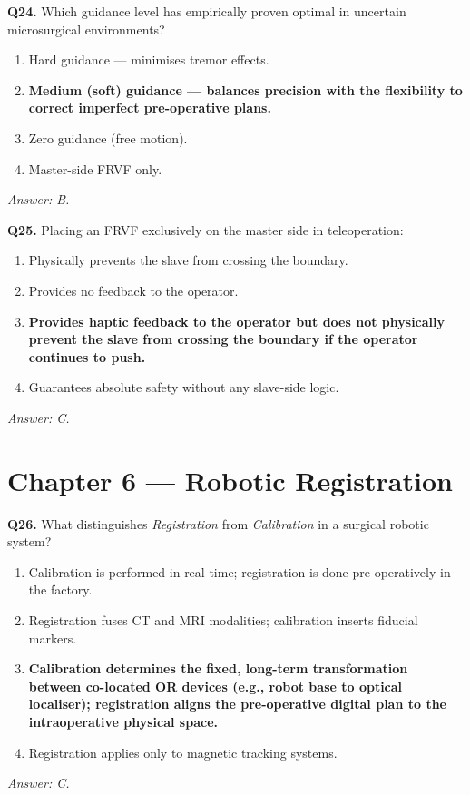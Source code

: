 \documentclass[11pt,a4paper,twoside]{report}
\begin{document}
\bigskip
\textbf{Q24.} Which guidance level has empirically proven optimal in uncertain microsurgical environments?
\begin{enumerate}[label=\Alph*.]
    \item Hard guidance — minimises tremor effects.
    \item \textbf{Medium (soft) guidance — balances precision with the flexibility to correct imperfect pre-operative plans.}
    \item Zero guidance (free motion).
    \item Master-side FRVF only.
\end{enumerate}
\textit{Answer: B.}

\bigskip
\textbf{Q25.} Placing an FRVF exclusively on the master side in teleoperation:
\begin{enumerate}[label=\Alph*.]
    \item Physically prevents the slave from crossing the boundary.
    \item Provides no feedback to the operator.
    \item \textbf{Provides haptic feedback to the operator but does not physically prevent the slave from crossing the boundary if the operator continues to push.}
    \item Guarantees absolute safety without any slave-side logic.
\end{enumerate}
\textit{Answer: C.}

\section{Chapter 6 — Robotic Registration}

\textbf{Q26.} What distinguishes \textit{Registration} from \textit{Calibration} in a surgical robotic system?
\begin{enumerate}[label=\Alph*.]
    \item Calibration is performed in real time; registration is done pre-operatively in the factory.
    \item Registration fuses CT and MRI modalities; calibration inserts fiducial markers.
    \item \textbf{Calibration determines the fixed, long-term transformation between co-located OR devices (e.g., robot base to optical localiser); registration aligns the pre-operative digital plan to the intraoperative physical space.}
    \item Registration applies only to magnetic tracking systems.
\end{enumerate}
\textit{Answer: C.}
\end{document}
